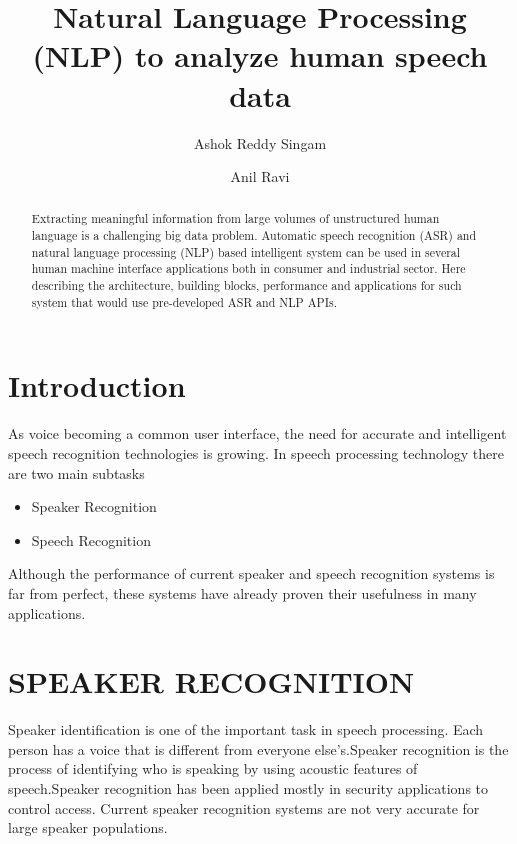 \documentclass[sigconf]{acmart}
\begin{document}
\title{Natural Language Processing (NLP) to analyze human speech data}

\author{Ashok Reddy Singam}

\author{Anil Ravi}

\begin{abstract}
Extracting meaningful information from large volumes of unstructured human language is a challenging big data problem. Automatic speech recognition (ASR) and natural language processing (NLP) based intelligent system can be  used in several human machine interface applications both in consumer and industrial sector. Here describing the architecture, building blocks, performance and applications for such system that would use pre-developed ASR and NLP APIs.
\end{abstract}



\maketitle


\section{Introduction}
As voice becoming a common user interface, the need for accurate and intelligent speech recognition technologies is growing. In speech processing technology there are two main subtasks 
   \begin{itemize}
     \item Speaker Recognition
     \item Speech Recognition
   \end{itemize}
Although the performance of current speaker and speech  recognition systems is far from perfect, these  systems  have already proven their usefulness in many applications. 
\section{SPEAKER RECOGNITION}
Speaker identification is one of the important task in speech processing. Each person has a voice that is different from everyone else's.Speaker recognition is the process of identifying who is speaking by using acoustic features of speech.Speaker recognition has been applied mostly in security applications to control access. Current speaker recognition systems are not very accurate for large speaker populations. 
\end{document}
